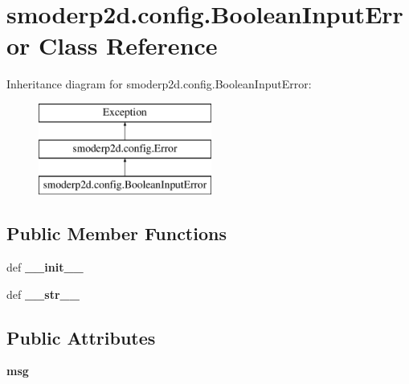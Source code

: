 \hypertarget{classsmoderp2d_1_1config_1_1BooleanInputError}{\section{smoderp2d.\-config.\-Boolean\-Input\-Error Class Reference}
\label{classsmoderp2d_1_1config_1_1BooleanInputError}
}
Inheritance diagram for smoderp2d.\-config.\-Boolean\-Input\-Error\-:\begin{figure}[H]
\begin{center}
\leavevmode
\includegraphics[height=3.000000cm]{d6/dee/classsmoderp2d_1_1config_1_1BooleanInputError}
\end{center}
\end{figure}
\subsection*{Public Member Functions}
\begin{DoxyCompactItemize}
\item 
\hypertarget{classsmoderp2d_1_1config_1_1BooleanInputError_a360baa4e5ed00b7e1be2f69c827bc744}{def {\bfseries \-\_\-\-\_\-init\-\_\-\-\_\-}}\label{classsmoderp2d_1_1config_1_1BooleanInputError_a360baa4e5ed00b7e1be2f69c827bc744}

\item 
\hypertarget{classsmoderp2d_1_1config_1_1BooleanInputError_a44476063da3a69ec01d9d0215fe03f17}{def {\bfseries \-\_\-\-\_\-str\-\_\-\-\_\-}}\label{classsmoderp2d_1_1config_1_1BooleanInputError_a44476063da3a69ec01d9d0215fe03f17}

\end{DoxyCompactItemize}
\subsection*{Public Attributes}
\begin{DoxyCompactItemize}
\item 
\hypertarget{classsmoderp2d_1_1config_1_1BooleanInputError_a4d9e5f70b1bb7cd8071adc203c15acc1}{{\bfseries msg}}\label{classsmoderp2d_1_1config_1_1BooleanInputError_a4d9e5f70b1bb7cd8071adc203c15acc1}

\end{DoxyCompactItemize}


